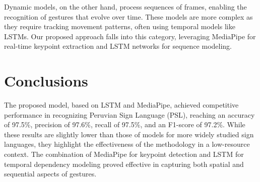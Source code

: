 \documentclass[preprint,12pt,authoryear]{elsarticle}
\begin{document}
Dynamic models, on the other hand, process sequences of frames, enabling the recognition of gestures that evolve over time. These models are more complex as they require tracking movement patterns, often using temporal models like LSTMs. Our proposed approach falls into this category, leveraging MediaPipe for real-time keypoint extraction and LSTM networks for sequence modeling.


\begin{table}[H]
    \centering
    \caption{Comparison of sign language recognition models based on architecture, type of recognition, and accuracy.}
    \label{tab:comparison2}
\end{table}

\section{Conclusions}
\label{sec:conclusions}
The proposed model, based on LSTM and MediaPipe, achieved competitive performance in recognizing Peruvian Sign Language (PSL), reaching an accuracy of 97.5\%, precision of 97.6\%, recall of 97.5\%, and an F1-score of 97.2\%. While these results are slightly lower than those of models for more widely studied sign languages, they highlight the effectiveness of the methodology in a low-resource context. The combination of MediaPipe for keypoint detection and LSTM for temporal dependency modeling proved effective in capturing both spatial and sequential aspects of gestures.  
\end{document}
